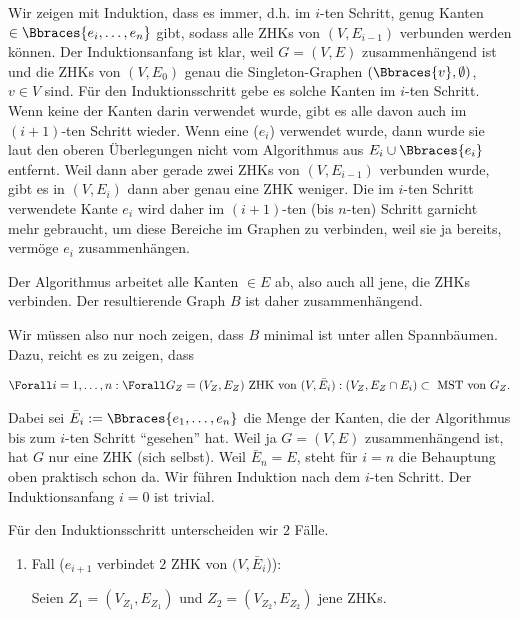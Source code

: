 \begin{solution}
\begin{enumerate}[label = (\Alph*)]
    Wir zeigen mit Induktion, dass es immer, d.h. im $i$-ten Schritt, genug Kanten $\in \Bbraces{e_i, \dots, e_n}$ gibt, sodass alle ZHKs von $(V, E_{i-1})$ verbunden werden können.
    Der Induktionsanfang ist klar, weil $G = (V, E)$ zusammenhängend ist und die ZHKs von $(V, E_0)$ genau die Singleton-Graphen $(\Bbraces{v}, \emptyset)$, $v \in V$ sind.
    Für den Induktionsschritt gebe es solche Kanten im $i$-ten Schritt.
    Wenn keine der Kanten darin verwendet wurde, gibt es alle davon auch im $(i+1)$-ten Schritt wieder.
    Wenn eine ($e_i$) verwendet wurde, dann wurde sie laut den oberen Überlegungen nicht vom Algorithmus aus $E_i \cup \Bbraces{e_i}$ entfernt.
    Weil dann aber gerade zwei ZHKs von $(V, E_{i-1})$ verbunden wurde, gibt es in $(V, E_i)$ dann aber genau eine ZHK weniger.
    Die im $i$-ten Schritt verwendete Kante $e_i$ wird daher im $(i+1)$-ten (bis $n$-ten) Schritt garnicht mehr gebraucht, um diese Bereiche im Graphen zu verbinden, weil sie ja bereits, vermöge $e_i$ zusammenhängen.

    Der Algorithmus arbeitet alle Kanten $\in E$ ab, also auch all jene, die ZHKs verbinden.
    Der resultierende Graph $B$ ist daher zusammenhängend.

    Wir müssen also nur noch zeigen, dass $B$ minimal ist unter allen Spannbäumen.
    Dazu, reicht es zu zeigen, dass

    \begin{align*}
        \Forall i = 1, \dots, n:
        \Forall G_Z = (V_Z, E_Z) ~\text{ZHK von}~ (V, \bar E_i):
        (V_Z, E_Z \cap E_i) \subset ~\text{MST von}~ G_Z.
    \end{align*}

    Dabei sei $\bar E_i := \Bbraces{e_1, \dots, e_n}$ die Menge der Kanten, die der Algorithmus bis zum $i$-ten Schritt \enquote{gesehen} hat.
    Weil ja $G = (V, E)$ zusammenhängend ist, hat $G$ nur eine ZHK (sich selbst).
    Weil $\bar E_n = E$, steht für $i = n$ die Behauptung oben praktisch schon da.
    Wir führen Induktion nach dem $i$-ten Schritt.
    Der Induktionsanfang $i = 0$ ist trivial.

    Für den Induktionsschritt unterscheiden wir $2$ Fälle.

    \begin{enumerate}[label = \arabic*.]

        \item Fall ($e_{i+1}$ verbindet $2$ ZHK von $(V, \bar E_i$)):
        
        Seien $Z_1 = (V_{Z_1}, E_{Z_1})$ und $Z_2 = (V_{Z_2}, E_{Z_2})$ jene ZHKs.


\end{enumerate}
\end{enumerate}
\end{solution}
